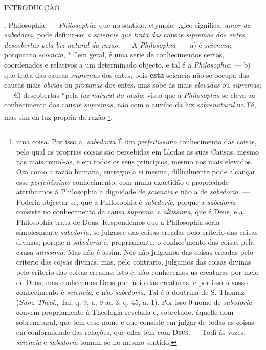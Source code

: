
 INTRODUCÇÃO

\textbar{}. Philosophia. --- \emph{Philosophia}, que no sentido. etymolo- .gico significa. \emph{amor da sabedoria}, pode definir-se: « \emph{sciencie que trata das} causas \emph{sipremas dos entes}, \emph{descobertas pela biz natural da razão}. --- A \emph{Philosophia} ---- a) é \emph{sciencia}; porquanto \emph{sciencia}, * \textasciicircum{}em geral, é uma serie de conhecimentos certos, coordenados e relativos a um determinado objecto, e tal é a \emph{Philosophia}; --- b) que trata das causas \emph{supremus} dos entes; pois \textbf{esta} sciencia não se occupa das causas mais \emph{obvias} ou \emph{proximas} dos entes, mas sobe ás mais \emph{elevadas} ou \emph{sipremas}; --- €) descobertas “pela \emph{luz natural do razão}; visto que a \emph{Philosophia} se cleva ao conhecimento das causas \emph{supremas}, não com o auxilio da luz \emph{sobrenatural} ua Fé, mas sim da luz propria da razão \footnote{uma coisa. Por isso a. \emph{sabedoria} É üm \emph{perfeitissimo} conhecimento das coisas, pelo qual as proprias coisas são percebidas em Llodas as suas Causas, mesmo nas mais remol-as, e em todos os seus principios, mesmo nos mais elevados. Ora como a razão humana, entregue a si mesma, dillicilmente pode alcançar esse \emph{perfeitissimo} conhecimento, com muila exactidão e propriedade attribuimos á Philosophia a dignidade de \emph{sciencia} e não a de \emph{sabedoria}. --- Poderia objectar-se, que a Philosophia é \emph{sabedoric}, porque a \emph{sabedoria} consiste no conhecimento da causa \emph{suprema}. c \emph{altissima}, que é Deus, e a. Philosophia trata de Deus. Respondemos que a Philosophia seria simplesmente \emph{sabedoria}, se julgasse das coisas creadas pelo criterio das coisas divinas; porque a \emph{sabedoria} é, propriamente, o conhec'mento das coisas pela causa \emph{altissima}. Mas não é assim. Nós não julgamos das coisas creadas pelo criterio das cojsas divinas, mas, pelo contrario, julgamos das coisas divinas \textbar{} pelo criterio das coisas creadas; isto é, não conhecemos us creaturas por meio de Deus, mas conhecemos Deus por meio das creaturas, e por isso o vosso conhecimento é \emph{sciencia}, e não \emph{sabedoria}. Tal é a doutrina de S. Thomaz (\emph{Sum}. \emph{Theol}., Tal, q, 9, a, 9 ad 3: q. 45, a. 1). Por isso 0 nome de \emph{sabedoria} convem propriamente á Theologia revelada e, sobretudo. áquelle dom sobrenatural, que tem esse nome e que consiste em julgar de todas as coisas em conformidade das relações, que ellas têm com \textsc{Deus}. --- Todi ás vezes. \emph{sciencia} e \emph{sabedoria} tomam-se no mesmo sentido.}.

